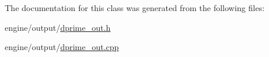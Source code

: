 The documentation for this class was generated from the following files:\begin{DoxyCompactItemize}
\item 
engine/output/\hyperlink{dprime__out_8h}{dprime\_\-out.h}\item 
engine/output/\hyperlink{dprime__out_8cpp}{dprime\_\-out.cpp}\end{DoxyCompactItemize}

